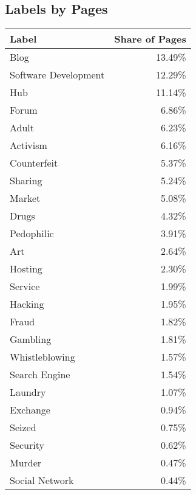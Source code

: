 \subsection{Labels by Pages}
\label{appendix:labelsByPages}
\begin{center}
    \begin{supertabular}[H]{l|r}
    \textbf{Label}		&	\textbf{Share of Pages}\\
	\hline
	\hline
	Blog		&	13.49\%\\
	\hline
	Software Development	&	12.29\%\\
	\hline
	Hub		&	11.14\%\\
	\hline
	Forum		&	6.86\%\\
	\hline
	Adult		&	6.23\%\\
	\hline
	Activism	&	6.16\%\\
	\hline
	Counterfeit	&	5.37\%\\
	\hline
	Sharing		&	5.24\%\\
	\hline
	Market		&	5.08\%\\
	\hline
	Drugs		&	4.32\%\\
	\hline
	Pedophilic	&	3.91\%\\
	\hline
	Art			&	2.64\%\\
	\hline
	Hosting		&	2.30\%\\
	\hline
	Service		&	1.99\%\\
	\hline
	Hacking		&	1.95\%\\
	\hline
	Fraud		&	1.82\%\\
	\hline
	Gambling	&	1.81\%\\
	\hline
	Whistleblowing			&	1.57\%\\
	\hline
	Search Engine			&	1.54\%\\
	\hline
	Laundry		&	1.07\%\\
	\hline
	Exchange	&	0.94\%\\
	\hline
	Seized		&	0.75\%\\
	\hline
	Security	&	0.62\%\\
	\hline
	Murder		&	0.47\%\\
	\hline
	Social Network			&	0.44\%\\
    \end{supertabular}
\end{center}
